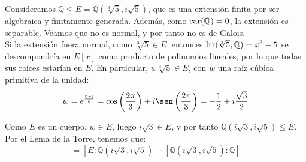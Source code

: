 \begin{ejemplo}
    Consideramos $\mathbb{Q}\leq E=\mathbb{Q}\left(\sqrt[3]{5},i\sqrt{5}\right)$, que es una extensión finita por ser algebraica y finitamente generada. Además, como $\operatorname{car}(\mathbb{Q})=0$, la extensión es separable. Veamos que no es normal, y por tanto no es de Galois.\\

    Si la extensión fuera normal, como $\sqrt[3]{5}\in E$, entonces $\operatorname{Irr}(\sqrt[3]{5},\mathbb{Q}) = x^3-5$ se descompondría en $E[x]$ como producto de polinomios lineales, por lo que todas sus raíces estarían en $E$. En particular, $w\sqrt[3]{5}\in E$, con $w$ una raíz cúbica primitiva de la unidad:
    \begin{equation*}
        w = e^{\frac{2\pi i}{3}} = \cos\left(\frac{2\pi}{3}\right) + i\sen\left(\frac{2\pi}{3}\right) = -\frac{1}{2} + i\frac{\sqrt{3}}{2}
    \end{equation*}

    Como $E$ es un cuerpo, $w\in E$, luego $i\sqrt{3}\in E$, y por tanto $\mathbb{Q}\left(i\sqrt{3},i\sqrt{5}\right)\leq E$. Por el Lema de la Torre, tenemos que:
    \begin{equation*}
        [E:\mathbb{Q}] = [E:\mathbb{Q}\left(i\sqrt{3},i\sqrt{5}\right)]\cdot \left[\mathbb{Q}\left(i\sqrt{3},i\sqrt{5}\right):\mathbb{Q}\right]
    \end{equation*}
    

\end{ejemplo}
